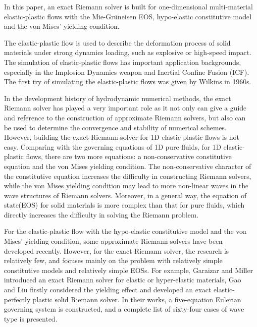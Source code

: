 \documentclass{article}
\numberwithin{equation}{section}
\numberwithin{table}{section}
\begin{document}
In this paper, an exact Riemann solver is built for one-dimensional  multi-material elastic-plastic flows with the Mie-Gr\"uneisen EOS, hypo-elastic constitutive model \cite{wilkins1963calculation} and  the von Mises' yielding condition.

The  elastic-plastic flow  is  used to describe the deformation process of solid materials under strong dynamics loading, such as explosive or high-speed impact. The simulation of elastic-plastic flows has important application backgrounds, especially in the Implosion Dynamics weapon and Inertial Confine Fusion (ICF). The first try of simulating the elastic-plastic flows was given by  Wilkins \cite{wilkins1963calculation} in 1960s.

In the development history of hydrodynamic numerical methods, the exact Riemann solver has played a very important role as it not only can give a guide and reference to the construction of approximate Riemann solvers, but also can be used to determine the convergence and stability of numerical schemes. However, building the exact Riemann solver for 1D elastic-plastic flows is not easy. Comparing with the governing equations of 1D pure fluids, for 1D elastic-plastic flows, there are two more equations: a non-conservative constitutive equation and the von Mises yielding condition.  The non-conservative character of the constitutive equation increases the difficulty in constructing  Riemann solvers, while the von Mises yielding condition may lead to more non-linear waves in the wave structures of Riemann solvers. Moreover, in a general way, the equation of state(EOS) for solid materials is more complex than that for pure fluids, which directly increases the difficulty in solving the Riemann problem.

For the elastic-plastic flow with the hypo-elastic constitutive model and  the von Mises' yielding condition,  some approximate Riemann solvers\cite{gavrilyuk2008modelling,cheng2015high,cheng2016harten,liumulti} have been developed recently. However, for the exact Riemann solver, the research is relatively few, and focuses mainly on the problem with relatively simple constitutive models and relatively simple EOSs.
For example, Garaizar \cite{garaizar1991solution} and Miller \cite{miller2004iterative} introduced  an exact Riemann solver for elastic or hyper-elastic materials, Gao and Liu \cite{gao20171d,gao2018complete} firstly considered the yielding effect and developed an exact elastic-perfectly plastic solid Riemann solver.  In their works, a five-equation Eulerian governing system is constructed, and a complete list of sixty-four cases of wave type is presented. 
\end{document}
